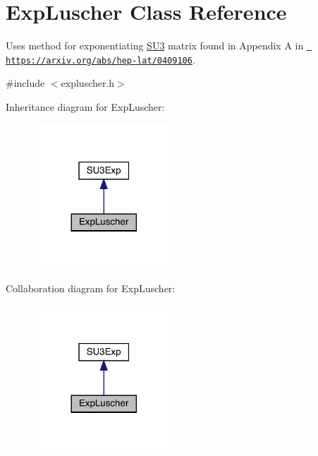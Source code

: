 \hypertarget{class_exp_luscher}{}\section{Exp\+Luscher Class Reference}
\label{class_exp_luscher}


Uses method for exponentiating \mbox{\hyperlink{class_s_u3}{S\+U3}} matrix found in Appendix A in \href{https://arxiv.org/abs/hep-lat/0409106}{\texttt{ https\+://arxiv.\+org/abs/hep-\/lat/0409106}}.  




{\ttfamily \#include $<$expluscher.\+h$>$}



Inheritance diagram for Exp\+Luscher\+:\nopagebreak
\begin{figure}[H]
\begin{center}
\leavevmode
\includegraphics[width=149pt]{class_exp_luscher__inherit__graph}
\end{center}
\end{figure}


Collaboration diagram for Exp\+Luscher\+:\nopagebreak
\begin{figure}[H]
\begin{center}
\leavevmode
\includegraphics[width=149pt]{class_exp_luscher__coll__graph}
\end{center}
\end{figure}
